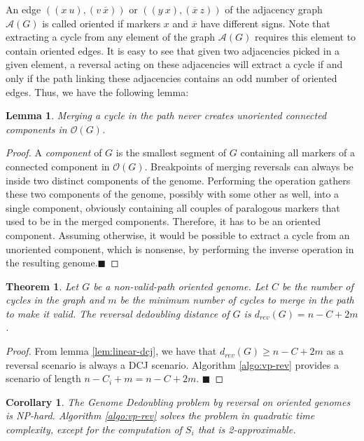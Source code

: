 \documentclass[11pt,final,twoside,nofrench]{thlifl}
\newcommand{\qed}{\ensuremath{\blacksquare}}
\newcommand{\fst}[1]{ \ensuremath{#1} }
\newcommand{\snd}[1]{ \ensuremath{\overline{#1}} }
\newcommand\aff[2]{\ensuremath{(\fst{#1}~\fst{#2})}}
\newcommand\asf[2]{\ensuremath{(\snd{#1}~\fst{#2})}}
\newcommand\afs[2]{\ensuremath{(\fst{#1}~\snd{#2})}}
\newtheorem{proof}{Proof}
\newtheorem{theorem}{Theorem}
\newtheorem{lemma}{Lemma}
\newtheorem{corollary}{Corollary}
\begin{document}
An edge $(\aff{x}{u},\afs{v}{x})$ or  $(\aff{y}{x},\asf{x}{z})$ of the adjacency graph $\mathcal{A}(G)$ is called oriented if markers $x$ and $\snd{x}$ have different signs.
Note that extracting a cycle from any element of the graph $\mathcal{A}(G)$ 
requires this element to contain oriented edges. It is easy to see that given two 
adjacencies picked in a given element, a reversal 
acting on these adjacencies will extract a cycle if and only if the path 
linking these adjacencies contains an odd number of oriented edges.
Thus, we have the following lemma:
\begin{lemma}
\label{lem:mergeorient}
Merging a cycle in the path never creates unoriented connected components
in $\mathcal{O}(G)$.
\end{lemma}
\begin{proof}
A \emph{component} of $G$ is the smallest segment of $G$ containing all 
markers of a connected component in $\mathcal{O}(G)$. Breakpoints of merging reversals can always be inside two distinct components
of the genome. Performing the operation gathers these two components of 
the genome, possibly with some other as well, into a single component, obviously containing all couples of paralogous markers that used to be in the merged components.
Therefore, it has to be an oriented component. Assuming otherwise, it would 
be possible to extract a cycle from an unoriented component, which is nonsense, by performing the inverse operation in the resulting genome.\qed
\end{proof}

\begin{theorem}
Let $G$ be a non-valid-path oriented genome. Let $C$ be the number of cycles in the graph  and $m$ be the minimum number of cycles to merge in the path to make it valid. The reversal dedoubling distance of $G$ is  $d_{rev}(G) = n-C+2m$.
\end{theorem}
\begin{proof}

From lemma \ref{lem:linear-dcj}, we have that $d_{rev}(G) \geq n - C + 2m$ as a reversal scenario is always a DCJ scenario.
Algorithm \ref{algo:vp-rev} provides a scenario of length 
$n-C_i + m = n - C + 2m$.
\qed
\end{proof}

\begin{corollary}
\label{lem:hardness-rev}
The Genome Dedoubling problem by reversal on oriented genomes is NP-hard.
Algorithm \ref{algo:vp-rev} solves the problem in quadratic time complexity, 
except for the computation of $S_i$ that is 2-approximable.
\end{corollary}
\end{document}
